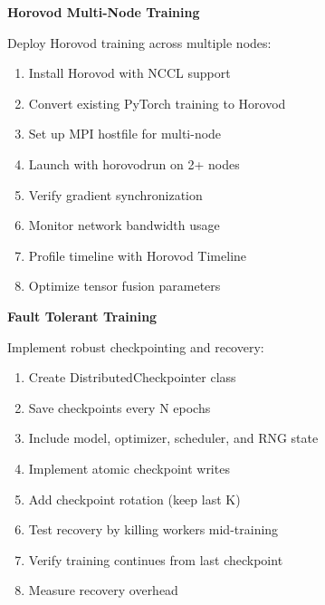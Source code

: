 \begin{exercise}
\textbf{Horovod Multi-Node Training}

Deploy Horovod training across multiple nodes:

\begin{enumerate}
    \item Install Horovod with NCCL support
    \item Convert existing PyTorch training to Horovod
    \item Set up MPI hostfile for multi-node
    \item Launch with horovodrun on 2+ nodes
    \item Verify gradient synchronization
    \item Monitor network bandwidth usage
    \item Profile timeline with Horovod Timeline
    \item Optimize tensor fusion parameters
\end{enumerate}
\end{exercise}

\begin{exercise}
\textbf{Fault Tolerant Training}

Implement robust checkpointing and recovery:

\begin{enumerate}
    \item Create DistributedCheckpointer class
    \item Save checkpoints every N epochs
    \item Include model, optimizer, scheduler, and RNG state
    \item Implement atomic checkpoint writes
    \item Add checkpoint rotation (keep last K)
    \item Test recovery by killing workers mid-training
    \item Verify training continues from last checkpoint
    \item Measure recovery overhead
\end{enumerate}
\end{exercise}

